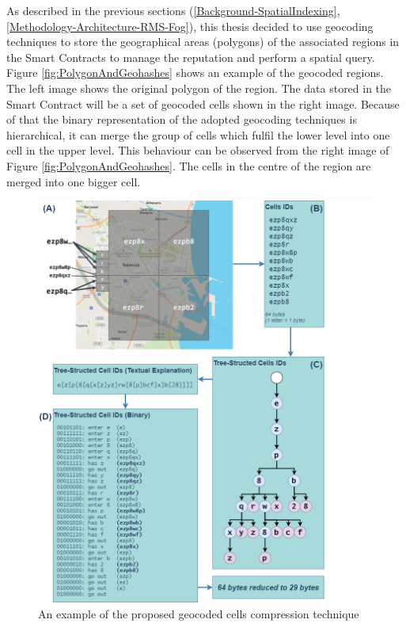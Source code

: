 \npara As described in the previous sections (\ref{Background-SpatialIndexing}, \ref{Methodology-Architecture-RMS-Fog}), this thesis decided to use geocoding techniques to store the geographical areas (polygons) of the associated regions in the Smart Contracts to manage the reputation and perform a spatial query.
Figure \ref{fig:PolygonAndGeohashes} shows an example of the geocoded regions.
The left image shows the original polygon of the region.
The data stored in the Smart Contract will be a set of geocoded cells shown in the right image.
Because of that the binary representation of the adopted geocoding techniques is hierarchical, it can merge the group of cells which fulfil the lower level into one cell in the upper level.
This behaviour can be observed from the right image of Figure \ref{fig:PolygonAndGeohashes}.
The cells in the centre of the region are merged into one bigger cell.

\begin{figure}[htb!]
  \centering
  \includegraphics[width=\textwidth]{images/GeocodingCompression.png}
  \caption{An example of the proposed geocoded cells compression technique}
  \label{fig:GeocodingCompression}
\end{figure}

